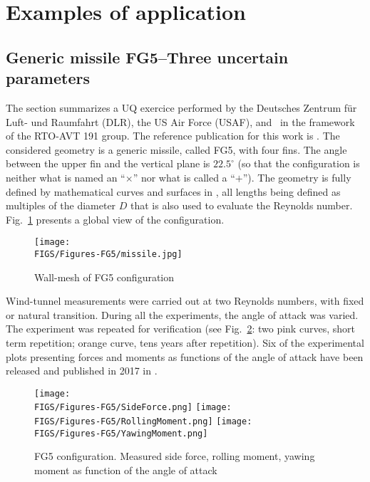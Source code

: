 \documentclass{eurosae}
\newcommand{\fref}[1]{Fig.~\ref{#1}}
\begin{document}
%
\section{Examples of application}\label{sec:Examples}
%
\subsection{Generic missile FG5--Three uncertain parameters}\label{sec:FG5}
%
 The section summarizes a UQ exercice performed by the Deutsches Zentrum f\"ur Luft- und Raumfahrt (DLR), the US Air Force (USAF), and \Onera\ in the framework of the RTO-AVT 191 group. The reference publication for this work is \cite{JPGoeGra_17}. The considered geometry is a generic missile, called FG5, with four fins. The angle between the upper fin and the vertical plane is $22.5^\circ$ (so that the configuration is neither what is named an ``$\times$'' nor what is called a ``$+$''). The geometry is fully defined by mathematical curves and surfaces in \cite{JPGoeGra_17}, all lengths being defined as multiples of the diameter $D$ that is also used to evaluate the Reynolds number. \fref{f:fg5} presents a global view of the configuration.
%
\begin{figure}[!h]
\begin{center}
\texttt{[image: \\FIGS/Figures-FG5/missile.jpg]}
\end{center}
\caption{Wall-mesh of FG5 configuration}\label{f:fg5}
\end{figure}
%
Wind-tunnel measurements were carried out at two Reynolds numbers, with fixed or natural transition. During all the experiments, the angle of attack was varied. The experiment was repeated for verification (see \fref{f:fg5e}: two pink curves, short term repetition; orange curve, tens years after repetition). Six of the experimental plots presenting forces and moments as functions of the angle of attack have been released and published in 2017 in \cite{JPGoeGra_17}.
%
\begin{figure}[!h]
\begin{center}
\texttt{[image: \\FIGS/Figures-FG5/SideForce.png]}
\texttt{[image: \\FIGS/Figures-FG5/RollingMoment.png]}
\texttt{[image: \\FIGS/Figures-FG5/YawingMoment.png]}
\end{center}
\caption{FG5 configuration. Measured side force, rolling moment, yawing moment as function of the angle of attack}
\label{f:fg5e}
\end{figure}
%
\end{document}
